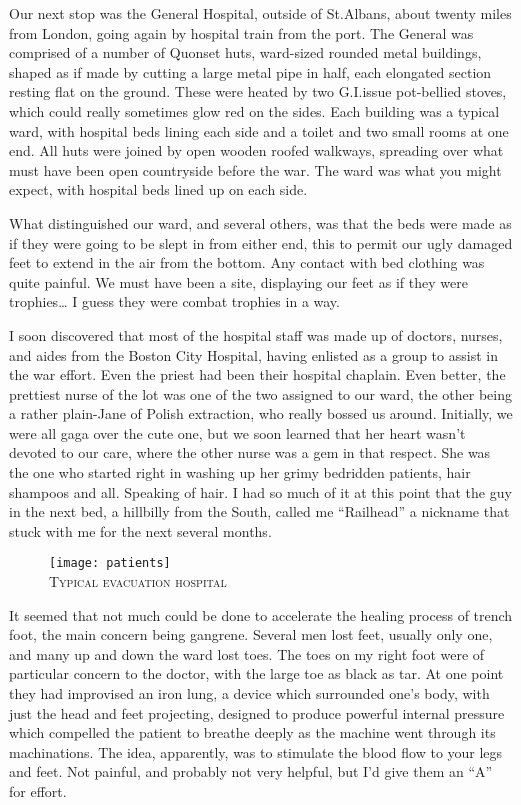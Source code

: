 \documentclass[../m3y]{subfiles}
\begin{document}
Our next stop was the  General Hospital, outside of St.\@ Albans, about twenty miles from London, going again by hospital train from the port. The  General was comprised of a number of Quonset huts, ward-sized rounded metal buildings, shaped as if made by cutting a large metal pipe in half, each elongated section resting flat on the ground. These were heated by two G.I.\@ issue pot-bellied stoves, which could really sometimes glow red on the sides. Each building was a typical ward, with hospital beds lining each side and a toilet and two small rooms at one end. All huts were joined by open wooden roofed walkways, spreading over what must have been open countryside before the war. The ward was what you might expect, with hospital beds lined up on each side.

What distinguished our ward, and several others, was that the beds were made as if they were going to be slept in from either end, this to permit our ugly damaged feet to extend in the air from the bottom. Any contact with bed clothing was quite painful. We must have been a site, displaying our feet as if they were trophies… I guess they were combat trophies in a way.

I soon discovered that most of the hospital staff was made up of doctors, nurses, and aides from the Boston City Hospital, having enlisted as a group to assist in the war effort. Even the priest had been their hospital chaplain. Even better, the prettiest nurse of the lot was one of the two assigned to our ward, the other being a rather plain-Jane of Polish extraction, who really bossed us around. Initially, we were all gaga over the cute one, but we soon learned that her heart wasn't devoted to our care, where the other nurse was a gem in that respect. She was the one who started right in washing up her grimy bedridden patients, hair shampoos and all. Speaking of hair. I had so much of it at this point that the guy in the next bed, a hillbilly from the South, called me ``Railhead'' a nickname that stuck with me for the next several months.

\begin{figure}[h]
\centering
\texttt{[image: patients]}\\
\medskip
{\newtimes\textsc{Typical evacuation hospital}}
\end{figure}

It seemed that not much could be done to accelerate the healing process of trench foot, the main concern being gangrene. Several men lost feet, usually only one, and many up and down the ward lost toes. The toes on my right foot were of particular concern to the doctor, with the large toe as black as tar. At one point they had improvised an iron lung, a device which surrounded one's body, with just the head and feet projecting, designed to produce powerful internal pressure which compelled the patient to breathe deeply as the machine went through its machinations. The idea, apparently, was to stimulate the blood flow to your legs and feet. Not painful, and probably not very helpful, but I'd give them an ``A'' for effort.
\end{document}

